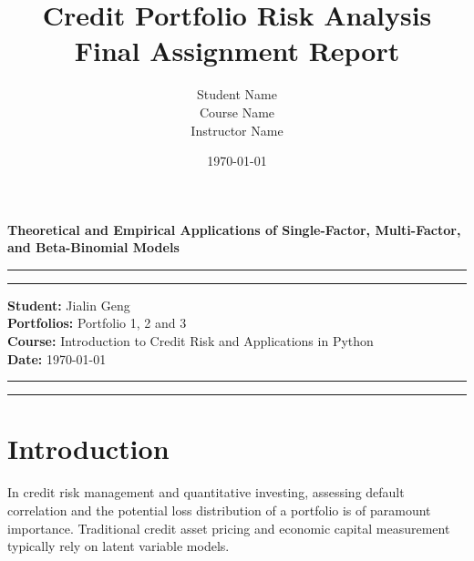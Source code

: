 \documentclass[12pt]{article}
\title{
    \vspace{4cm}
    {\Huge \bfseries Credit Portfolio Risk Analysis} \\
    \vspace{1.5cm}
    {\Large Final Assignment Report} \\
    \vspace{2cm}
}
\author{
    \Large Student Name \\
    \vspace{0.5cm}
    Course Name \\
    Instructor Name
}
\date{\today}
\begin{document}

\begin{titlepage}
    \centering

    \vspace*{2cm}

    {\Huge \bfseries \textbf{Theoretical and Empirical Applications of Single-Factor, Multi-Factor, and Beta-Binomial Models}

 \par}





    \vspace{2cm}

    \rule{0.8\textwidth}{0.5pt}
    \rule{0.8\textwidth}{0.5pt}

    \vspace{3cm}

    \begin{center}
    \large
    \textbf{Student:} Jialin Geng \\
    \vspace{0.3cm}
    \textbf{Portfolios:} Portfolio 1, 2 and 3 \\
    \vspace{0.3cm}
    \textbf{Course:} Introduction to Credit Risk and Applications in Python  \\
    \vspace{0.3cm}
    \textbf{Date:} \today
    \end{center}

    \vspace{3cm}

    \rule{0.8\textwidth}{0.5pt}
    \rule{0.8\textwidth}{0.5pt}




\end{titlepage}


\newpage

\tableofcontents

\newpage


\section{Introduction}
In credit risk management and quantitative investing, assessing default correlation and the potential loss distribution of a portfolio is of paramount importance. Traditional credit asset pricing and economic capital measurement typically rely on latent variable models.
\end{document}
